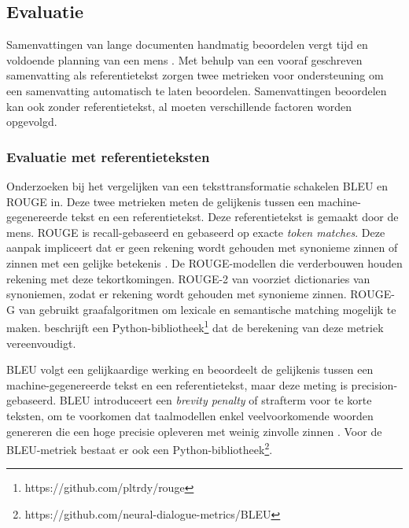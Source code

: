 \subsection{Evaluatie}

Samenvattingen van lange documenten handmatig beoordelen vergt tijd en voldoende planning van een mens \autocite{Nenkova2004}. Met behulp van een vooraf geschreven samenvatting als referentietekst zorgen twee metrieken voor ondersteuning om een samenvatting automatisch te laten beoordelen. Samenvattingen beoordelen kan ook zonder referentietekst, al moeten verschillende factoren worden opgevolgd.

\subsubsection{Evaluatie met referentieteksten}

Onderzoeken bij het vergelijken van een teksttransformatie schakelen BLEU en ROUGE in. Deze twee metrieken meten de gelijkenis tussen een machine-gegenereerde tekst en een referentietekst. Deze referentietekst is gemaakt door de mens. ROUGE is recall-gebaseerd en gebaseerd op exacte \textit{token matches}. Deze aanpak impliceert dat er geen rekening wordt gehouden met synonieme zinnen of zinnen met een gelijke betekenis \autocite{Lin2004}. De ROUGE-modellen die verderbouwen houden rekening met deze tekortkomingen. ROUGE-2 van \textcite{Ganesan2018} voorziet dictionaries van synoniemen, zodat er rekening wordt gehouden met synonieme zinnen. ROUGE-G van \textcite{ShafieiBavani2018} gebruikt graafalgoritmen om lexicale en semantische matching mogelijk te maken. \textcite{Lin2004} beschrijft een Python-bibliotheek\footnote{https://github.com/pltrdy/rouge} dat de berekening van deze metriek vereenvoudigt.

BLEU volgt een gelijkaardige werking en beoordeelt de gelijkenis tussen een machine-gegenereerde tekst en een referentietekst, maar deze meting is precision-gebaseerd. BLEU introduceert een \textit{brevity penalty} of strafterm voor te korte teksten, om te voorkomen dat taalmodellen enkel veelvoorkomende woorden genereren die een hoge precisie opleveren met weinig zinvolle zinnen \autocite{Chiusano2022}. Voor de BLEU-metriek bestaat er ook een Python-bibliotheek\footnote{https://github.com/neural-dialogue-metrics/BLEU}. 

